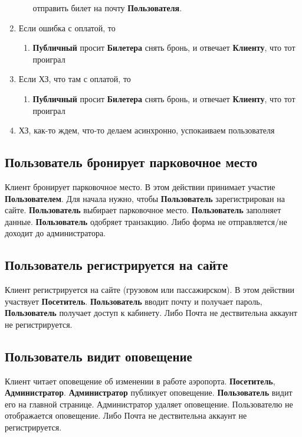 \begin{enumerate}
\begin{enumerate}
                        отправить билет на почту \textbf{Пользователя}.
            \end{enumerate}
      \item Если ошибка с оплатой, то
            \begin{enumerate}
                  \item \textbf{Публичный} просит \textbf{Билетера}
                        снять бронь, и отвечает \textbf{Клиенту},
                        что тот проиграл
            \end{enumerate}
      \item Если ХЗ, что там с оплатой, то
            \begin{enumerate}
                  \item \textbf{Публичный} просит \textbf{Билетера}
                        снять бронь, и отвечает \textbf{Клиенту},
                        что тот проиграл
            \end{enumerate}
      \item ХЗ, как-то ждем, что-то делаем асинхронно,
            успокаиваем пользователя
\end{enumerate}

\subsection{Пользователь бронирует парковочное место}
Клиент бронирует парковочное место. В этом действии
принимает участие \textbf{Пользователем}. Для начала
нужно, чтобы \textbf{Пользователь} зарегистрирован на
сайте. \textbf{Пользователь} выбирает парковочное место.
\textbf{Пользователь} заполняет данные. \textbf{Пользователь}
одобряет транзакцию. Либо форма не отправляется/не доходит
до администратора.

\subsection{Пользователь регистрируется на сайте}
Клиент регистрируется на сайте (грузовом или пассажирском).
В этом действии участвует \textbf{Посетитель}.
\textbf{Пользователь} вводит почту и получает пароль,
\textbf{Пользователь} получает доступ к кабинету.
Либо Почта не дествительна аккаунт не регистрируется.

\subsection{Пользователь видит оповещение}
Клиент читает оповещение об изменении в работе аэропорта.
\textbf{Посетитель}, \textbf{Администратор}.
\textbf{Администратор} публикует оповещение.
\textbf{Пользователь} видит его на главной странице.
Администратор удаляет оповещение. Пользователю не
отображается оповещение. Либо Почта не дествительна
аккаунт не регистрируется.

